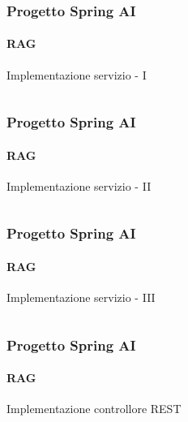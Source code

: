 %
\begin{frame}[t,fragile] \frametitle{Progetto Spring AI}
    \framesubtitle{RAG}
        \vspace*{-.7cm}
        \begin{block}{Implementazione servizio - I}
			{\tiny\inputminted{java}{code/RAGServiceImpl.java}}
    	\end{block}
\end{frame}
%
\begin{frame}[t,fragile] \frametitle{Progetto Spring AI}
    \framesubtitle{RAG}
        \vspace*{-.7cm}
        \begin{block}{Implementazione servizio - II}
			{\tiny\inputminted{java}{code/RAGServiceImpl-2.java}}
    	\end{block}
\end{frame}
%
\begin{frame}[t,fragile] \frametitle{Progetto Spring AI}
    \framesubtitle{RAG}
        \vspace*{-.7cm}
        \begin{block}{Implementazione servizio - III}
			{\tiny\inputminted{java}{code/RAGServiceImpl-3.java}}
    	\end{block}
\end{frame}
%
\begin{frame}[t,fragile] \frametitle{Progetto Spring AI}
    \framesubtitle{RAG}
    	\vspace*{-.7cm}
        \begin{block}{Implementazione controllore REST}
			{\tiny\inputminted{java}{code/QuestionController.java}}
    	\end{block}
\end{frame}
%
